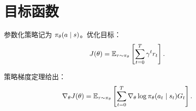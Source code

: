 \section{目标函数}

参数化策略记为 $\pi_{\theta}(a\mid s)$。优化目标：
\[
  J(\theta)=\mathbb{E}_{\tau\sim\pi_{\theta}}
  \left[
    \sum_{t=0}^{T}\gamma^t r_t
  \right].
\]

策略梯度定理给出：
\[
  \nabla_{\theta}J(\theta)
  =
  \mathbb{E}_{\tau\sim\pi_{\theta}}
  \left[
    \sum_{t=0}^{T}
    \nabla_{\theta}\log\pi_{\theta}(a_t\mid s_t)G_t
  \right].
\]
